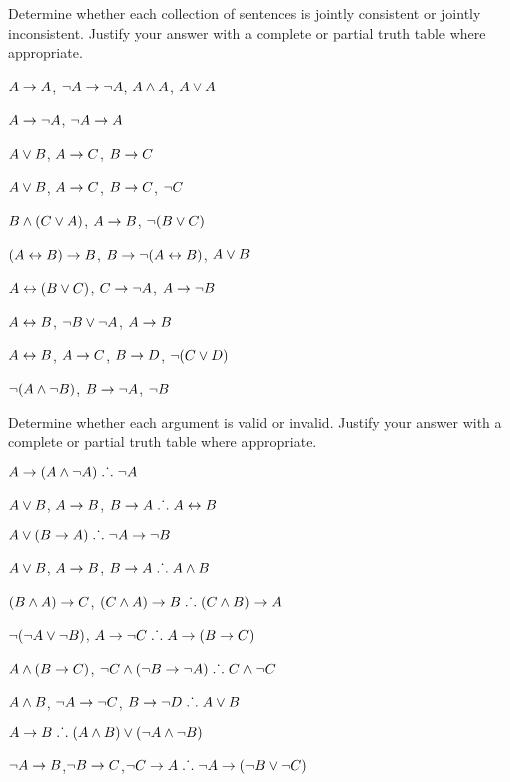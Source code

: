 \noindent\problempart
\label{pr.TT.consistent5}
Determine whether each collection of sentences is jointly consistent or jointly inconsistent. Justify your answer with a complete or partial truth table where appropriate.
\begin{earg}
\item $A\rightarrow A$, $\neg A \rightarrow \neg A$, $A\wedge A$, $A\vee A$ %
\item $A \rightarrow \neg A$, $\neg A \rightarrow A$%
\item $A\vee B$, $A\rightarrow C$, $B\rightarrow C$ %
\item $A \vee B$, $A \rightarrow C$, $B \rightarrow C$, $\neg C$ %
\item $B\wedge(C\vee A)$, $A\rightarrow B$, $\neg(B\vee C)$  %
\item $(A \leftrightarrow B) \rightarrow B$,  $B \rightarrow \neg (A \leftrightarrow B)$, $A \vee B$  %
\item $A\leftrightarrow(B\vee C)$, $C\rightarrow \neg A$, $A\rightarrow \neg B$ %
\item  $A \leftrightarrow B$,  $\neg B \vee \neg A$,  $A \rightarrow  B$ %
\item $A \leftrightarrow B$, $A \rightarrow C$, $B \rightarrow D$, $\neg(C \vee D)$ %
\item $\neg (A \wedge \neg B)$,  $B \rightarrow \neg A$, $\neg B$   %
\end{earg}

\noindent\problempart Determine whether each argument is valid or invalid. Justify your answer with a complete or partial truth table where appropriate.
\label{pr.TT.valid5} 
\begin{earg}
\item $A\rightarrow(A\wedge\neg A)\mathrel{\ldotp\dot{}\,\ldotp} \neg A$%
\item $A \vee B$, $A \rightarrow B$, $B \rightarrow A \mathrel{\ldotp\dot{}\,\ldotp}  A \leftrightarrow B$  %
\item $A\vee(B\rightarrow A)\mathrel{\ldotp\dot{}\,\ldotp} \neg A \rightarrow \neg B$ %
\item $A \vee B$, $A \rightarrow B$, $ B \rightarrow A \mathrel{\ldotp\dot{}\,\ldotp}  A \wedge B$ %
\item $(B\wedge A)\rightarrow C$, $(C\wedge A)\rightarrow B\mathrel{\ldotp\dot{}\,\ldotp} (C\wedge B)\rightarrow A$ %
\item $\neg (\neg A \vee \neg B)$, $A \rightarrow \neg C \mathrel{\ldotp\dot{}\,\ldotp}  A \rightarrow (B \rightarrow C)$ %
\item $A \wedge (B \rightarrow C)$, $\neg C \wedge (\neg B \rightarrow \neg A)\mathrel{\ldotp\dot{}\,\ldotp} C \wedge \neg C$ %
\item $A \wedge B$, $\neg A \rightarrow \neg C$, $B \rightarrow \neg D \mathrel{\ldotp\dot{}\,\ldotp}  A \vee B$ %
\item $A \rightarrow B\mathrel{\ldotp\dot{}\,\ldotp} (A \wedge B) \vee (\neg A \wedge \neg B)$ %
\item $\neg A \rightarrow B$,$ \neg B \rightarrow C $,$ \neg C \rightarrow A \mathrel{\ldotp\dot{}\,\ldotp}  \neg A \rightarrow (\neg B \vee \neg C) $%

\end{earg}

